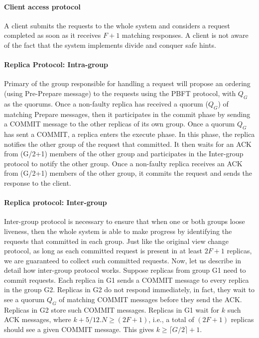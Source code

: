 \documentclass[twocolumn,10pt]{article}
\begin{document}
\paragraph{Client access protocol} A client submits the requests to the whole system and considers
a request completed as soon as it receives $F+1$ matching responses. A client is not aware of the fact
that the system implements divide and conquer safe hints.


\paragraph{Replica Protocol: Intra-group} Primary of the group responsible for handling a request 
will propose an ordering (using Pre-Prepare message) to the requests using the PBFT protocol, with $Q_G$ as the quorums. Once a non-faulty replica has received a quorum ($Q_G$) of matching Prepare messages, then it participates in the commit phase
by sending a COMMIT message to the other replicas of its own group. Once a quorum $Q_G$ has sent a COMMIT,
a replica enters the execute phase. In this phase, the replica notifies the other group of the request that committed. 
It then waits for an ACK from (G/2+1) members of the other group and 
participates in the Inter-group protocol to notify the other group. Once a non-faulty replica receives an
ACK from (G/2+1) members of the other group, it commits the request and sends the response to the client. 


\paragraph{Replica protocol: Inter-group} Inter-group protocol is necessary to ensure that when one or both
groups loose liveness, then the whole system is able to make progress by identifying the requests that committed
in each group. Just like the original view change protocol, as long as each committed request is present in at least
$2F+1$ replicas, we are guaranteed to collect such committed requests. Now, let us describe in detail how inter-group protocol works.
Suppose replicas from group G1 need to commit requests. Each replica in G1 sends a COMMIT message to every
replica in the group G2. Replicas in G2 do not respond immediately, in fact, they wait to see a quorum $Q_G$ of matching
COMMIT messages before they send the ACK. Replicas in G2 store such COMMIT messages. 
Replicas in G1 wait for $k$ such ACK messages, where $k+5/12.N \ge (2F+1)$, i.e., a total of $(2F+1)$ replicas should see a 
given COMMIT message. This gives $k\ge\lceil G/2 \rceil+1$.
\end{document}
